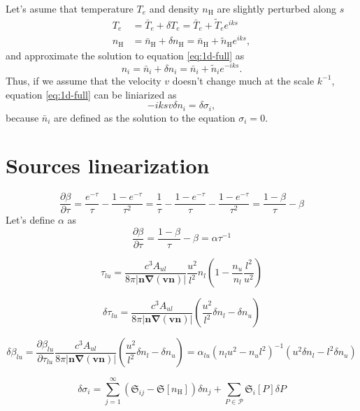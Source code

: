 \documentclass{article}
\begin{document}
Let's asume that temperature \(T_e\) and density \(n_\mathrm{H}\) are slightly perturbed along \(s\)
\begin{equation}
\begin{aligned}
    T_e &= \bar{T}_e + \delta T_e = \bar{T}_e + \tilde{T}_e e^{iks}\\
    n_\mathrm{H} &= \bar{n}_\mathrm{H} + \delta n_\mathrm{H} = \bar{n}_\mathrm{H} + \tilde{n}_\mathrm{H} e^{iks},
\end{aligned}
\end{equation}
and approximate the solution to equation \eqref{eq:1d-full} as
\begin{equation}
n_i = \bar{n}_i + \delta n_i = \bar{n}_i + \tilde{n}_i e^{-iks}.
\end{equation}
Thus, if we assume that the velocity \(v\) doesn't change much at the scale \(k^{-1}\), equation \eqref{eq:1d-full} can be liniarized as
\begin{equation}
    -iksv\delta n_i = \delta\sigma_i,
\end{equation}
because \(\bar{n}_i\) are defined as the solution to the equation \(\sigma_i = 0\). 
 
\section{Sources linearization}

\[
\frac{\partial \beta}{\partial \tau} = \frac{e^{-\tau}}{\tau} - \frac{1-e^{-\tau}}{\tau^2} = \frac{1}{\tau} - \frac{1 - e^{-\tau}}{\tau}  - \frac{1 - e^{-\tau}}{\tau^2} = \frac{1-\beta}{\tau} - \beta
\]
Let's define \(\alpha\) as
\[
\frac{\partial \beta}{\partial \tau} = \frac{1-\beta}{\tau} - \beta = \alpha \tau^{-1}
\]

\[
    \tau_{lu} = \frac{c^3A_{ul}}{8\pi |\mathbf{n}\mathbf{\nabla}(\mathbf{v}\mathbf{n})|}\frac{u^2}{l^2} n_l \left(1 - \frac{n_u}{n_l}\frac{l^2}{u^2}\right)
\]

\[
    \delta\tau_{lu} =  \frac{c^3A_{ul}}{8\pi |\mathbf{n}\mathbf{\nabla}(\mathbf{v}\mathbf{n})|}\left( \frac{u^2}{l^2}\delta n_l - \delta n_u \right)
\]

\[
    \delta\beta_{lu} = \frac{\partial \beta_{lu}}{\partial \tau_{lu}} \frac{c^3A_{ul}}{8\pi |\mathbf{n}\mathbf{\nabla}(\mathbf{v}\mathbf{n})|}\left( \frac{u^2}{l^2}\delta n_l - \delta n_u \right) = \alpha_{lu}(n_lu^2 - n_ul^2)^{-1}(u^2\delta n_l - l^2 \delta n_u)
\]


\[
    \delta\sigma_i = \sum\limits_{j = 1}^\infty  \left(\mathfrak{S}_{ij}-\mathfrak{S}[n_\mathrm{H}]\right)\delta n_j + \sum\limits_{P \in \mathcal{P}}\mathfrak{S}_i[P]\delta{P}
\]
\end{document}
